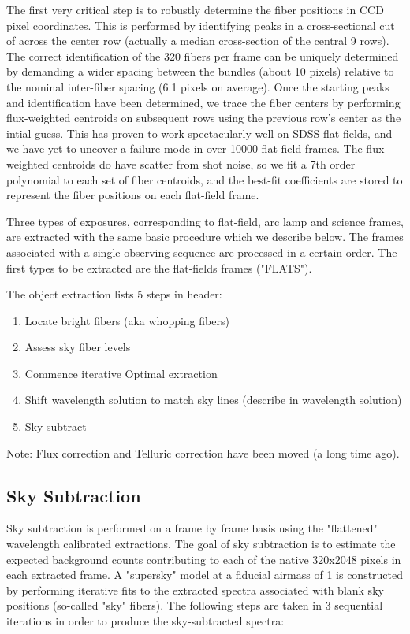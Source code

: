 The first very critical step is to robustly determine the fiber positions in CCD pixel coordinates.
This is performed by identifying peaks in a cross-sectional cut of across the center row (actually a median
cross-section of the central 9 rows).  The correct identification of the 320
fibers per frame can be uniquely determined by demanding a wider spacing between the bundles (about 10 pixels)
relative to the nominal inter-fiber spacing (6.1 pixels on average).  Once the starting peaks and 
identification have been determined, we trace the fiber centers by performing flux-weighted centroids on subsequent rows
using the previous row's center as the intial guess.  This has proven to work spectacularly well on SDSS
flat-fields, and we have yet to uncover a failure mode in over 10000 flat-field frames.
The flux-weighted centroids do have scatter from shot noise, so we fit a 7th order polynomial to each set of
fiber centroids, and the best-fit coefficients are stored to represent the fiber positions on each
flat-field frame.

 




Three types of exposures, corresponding to flat-field, arc lamp and science frames,
 are extracted with the same basic procedure
which we describe below.  The frames associated with a single observing sequence 
are processed in a certain order.  The first types to be extracted are the 
flat-fields frames ("FLATS").  

The object extraction lists 5 steps in header:

\begin{enumerate}
\item{Locate bright fibers (aka whopping fibers)}
\item{Assess sky fiber levels}
\item{Commence iterative Optimal extraction }
\item{Shift wavelength solution to match sky lines (describe in wavelength solution)}
\item{Sky subtract}

\end{enumerate}

Note: Flux correction and Telluric correction have been moved (a long time ago).


\subsection{Sky Subtraction}

Sky subtraction is performed on a frame by frame basis using the 
"flattened" wavelength calibrated extractions.  The goal of sky subtraction
is to estimate the expected background counts contributing to each of 
the native 320x2048 pixels in each extracted frame.  A "supersky" model 
at a fiducial airmass of 1 is constructed by performing iterative fits to
the extracted spectra associated with blank sky positions (so-called
"sky" fibers).   The following steps are taken in 3 sequential iterations
in order to produce the sky-subtracted spectra:

